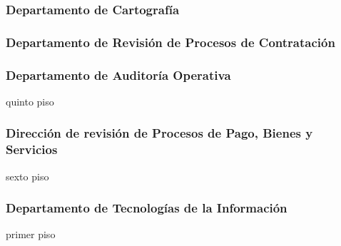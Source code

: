 \subsubsection{Departamento de Cartografía }

\subsubsection{Departamento de Revisión de Procesos de Contratación }

\subsubsection{Departamento de Auditoría Operativa}
 {quinto piso}

\subsubsection{Dirección de revisión de Procesos de Pago, Bienes y Servicios}
 {sexto piso}

\subsubsection{Departamento de Tecnologías de la Información}
 {primer piso}
